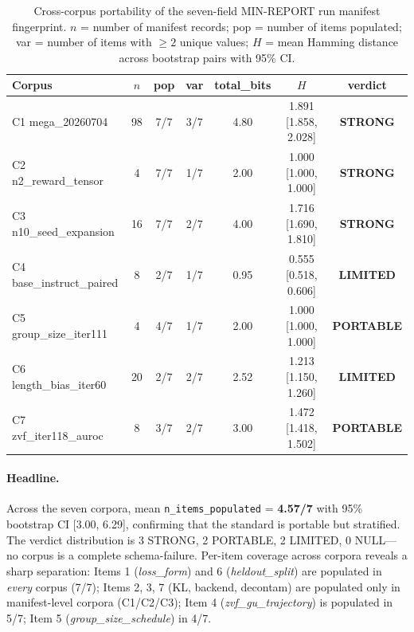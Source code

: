 \documentclass{article}  \usepackage[preprint,nonatbib]{neurips_2026} \usepackage[numbers]{natbib}
\begin{document}
\begin{table}[t]
\centering
\caption{Cross-corpus portability of the seven-field MIN-REPORT run manifest
fingerprint. $n$ = number of manifest records; pop = number of
items populated; var = number of items with $\geq 2$ unique values;
$H$ = mean Hamming distance across bootstrap pairs with 95\% CI.}
\label{tab:p5-cross-corpus}
\small
\begin{tabular}{@{}lcccccc@{}}
\toprule
Corpus & $n$ & pop & var & total\_bits & $H$ & verdict \\
\midrule
C1 mega\_20260704            &  98 & 7/7 & 3/7 & 4.80 & 1.891 [1.858, 2.028] & \textbf{STRONG} \\
C2 n2\_reward\_tensor         &   4 & 7/7 & 1/7 & 2.00 & 1.000 [1.000, 1.000] & \textbf{STRONG} \\
C3 n10\_seed\_expansion       &  16 & 7/7 & 2/7 & 4.00 & 1.716 [1.690, 1.810] & \textbf{STRONG} \\
C4 base\_instruct\_paired     &   8 & 2/7 & 1/7 & 0.95 & 0.555 [0.518, 0.606] & \textbf{LIMITED} \\
C5 group\_size\_iter111       &   4 & 4/7 & 1/7 & 2.00 & 1.000 [1.000, 1.000] & \textbf{PORTABLE} \\
C6 length\_bias\_iter60       &  20 & 2/7 & 2/7 & 2.52 & 1.213 [1.150, 1.260] & \textbf{LIMITED} \\
C7 zvf\_iter118\_auroc        &   8 & 3/7 & 2/7 & 3.00 & 1.472 [1.418, 1.502] & \textbf{PORTABLE} \\
\bottomrule
\end{tabular}
\end{table}

\paragraph{Headline.}
Across the seven corpora, mean \texttt{n\_items\_populated} =
\textbf{4.57/7} with 95\% bootstrap CI [3.00, 6.29], confirming that
the standard is portable but stratified. The verdict distribution is
3 STRONG, 2 PORTABLE, 2 LIMITED, 0 NULL---no corpus is a complete
schema-failure. Per-item coverage across corpora reveals a sharp
separation: Items 1 (\textit{loss\_form}) and 6
(\textit{heldout\_split}) are populated in \emph{every} corpus
(7/7); Items 2, 3, 7 (KL, backend, decontam) are populated only in
manifest-level corpora (C1/C2/C3); Item 4 (\textit{zvf\_gu\_trajectory})
is populated in 5/7; Item 5 (\textit{group\_size\_schedule}) in 4/7.
\end{document}
